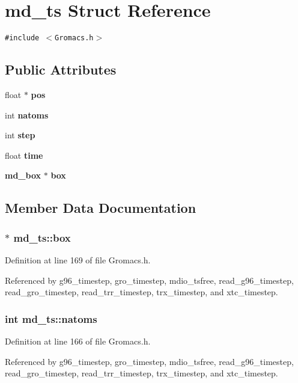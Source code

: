 \section{md\_\-ts  Struct Reference}
\label{structmd__ts}
{\tt \#include $<$Gromacs.h$>$}

\subsection*{Public Attributes}
\begin{CompactItemize}
\item 
float $\ast$ {\bf pos}
\item 
int {\bf natoms}
\item 
int {\bf step}
\item 
float {\bf time}
\item 
{\bf md\_\-box} $\ast$ {\bf box}
\end{CompactItemize}


\subsection{Member Data Documentation}
\subsubsection{$\ast$ md\_\-ts::box}\label{structmd__ts_m4}




Definition at line 169 of file Gromacs.h.

Referenced by g96\_\-timestep, gro\_\-timestep, mdio\_\-tsfree, read\_\-g96\_\-timestep, read\_\-gro\_\-timestep, read\_\-trr\_\-timestep, trx\_\-timestep, and xtc\_\-timestep.
\subsubsection{\setlength{\rightskip}{0pt plus 5cm}int md\_\-ts::natoms}\label{structmd__ts_m1}




Definition at line 166 of file Gromacs.h.

Referenced by g96\_\-timestep, gro\_\-timestep, mdio\_\-tsfree, read\_\-g96\_\-timestep, read\_\-gro\_\-timestep, read\_\-trr\_\-timestep, trx\_\-timestep, and xtc\_\-timestep.
